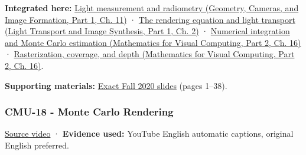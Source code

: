 \textbf{Integrated here:} \href{../03-Geometry-Cameras-and-Image-Formation-P01/main.pdf\#03-visual-computing-i-ch004-light-measurement-and-radiometry}{Light measurement and radiometry (Geometry, Cameras, and Image Formation, Part 1, Ch. 11)} · \href{../04-Light-Transport-and-Image-Synthesis-P01/main.pdf\#03-visual-computing-i-ch007-the-rendering-equation-and-light-transport}{The rendering equation and light transport (Light Transport and Image Synthesis, Part 1, Ch. 2)} · \href{../02-Mathematics-for-Visual-Computing-P02/main.pdf\#03-visual-computing-i-ch012-numerical-integration-and-monte-carlo-estimation}{Numerical integration and Monte Carlo estimation (Mathematics for Visual Computing, Part 2, Ch. 16)} · \href{../02-Mathematics-for-Visual-Computing-P02/main.pdf\#03-visual-computing-i-ch012-rasterization-coverage-and-depth}{Rasterization, coverage, and depth (Mathematics for Visual Computing, Part 2, Ch. 16)}.

\textbf{Supporting materials:} \href{https://15462.courses.cs.cmu.edu/fall2020content/lectures/17_numericalintegration/17_numericalintegration_slides.pdf}{Exact Fall 2020 slides} (pages 1--38).

\subsubsection{CMU-18 - Monte Carlo Rendering}\label{04-visual-computing-ii-ch036-cmu-18---monte-carlo-rendering}

\hypertarget{04-visual-computing-ii-ch036-cmu-18---monte-carlo-rendering}{}

\href{https://www.youtube.com/watch?v=FUZJNlRqrAc}{Source video} · \textbf{Evidence used:} YouTube English automatic captions, original English preferred.

